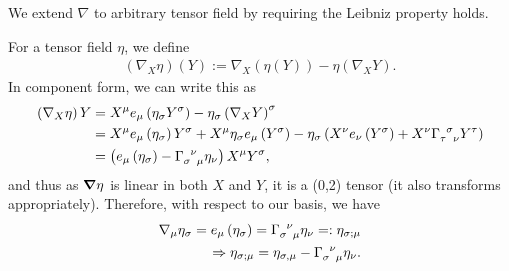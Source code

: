 We extend $\nabla$ to arbitrary tensor field by requiring the Leibniz property holds.
\begin{example}
    For a tensor field $\eta$, we define
    \begin{align}
        \left( \nabla_{X} \eta \right)  \left( Y \right) := \nabla_X \left( \eta \left( Y \right)  \right) - \eta \left( \nabla_X Y \right) 
    .\end{align}
    In component form, we can write this as
    \begin{align}
        \left( \nabla_X \eta \right) Y &= X^{\mu} e_\mu \left( \eta_\sigma Y^{\sigma} \right) - \eta_{\sigma} \left( \nabla_{X} Y \right)^{\sigma} \\
        &= X^{\mu} e_\mu \left( \eta_\sigma \right) Y^{\sigma} + X^{\mu} \eta_\sigma e_\mu \left( Y^{\sigma}\right) - \eta_\sigma \left( X^{\nu} e_\nu \left( Y^{\sigma}   \right) + X^{\nu} \tensor{\Gamma}{_{\tau}^{\sigma}_{\nu}} Y^{\tau} \right)  \\
        &= \left( e_{\mu} \left( \eta_{\sigma} \right) - \tensor{\Gamma}{_{\sigma}^{\nu}_{\mu}} \eta_{\nu} \right) X^{\mu} Y^{\sigma}
    ,\end{align}
    and thus as $\grad \eta$ is linear in both $X$ and $Y$, it is a (0,2) tensor (it also transforms appropriately).
    Therefore, with respect to our basis, we have
    \begin{align}
        \nabla_\mu \eta_\sigma = e_\mu \left( \eta_\sigma \right)  = \tensor{\Gamma}{_{\sigma}^{\nu}_\mu} \eta_\nu =: \eta_{\sigma ; \mu} \\
        \implies \eta_{\sigma ; \mu} = \eta_{\sigma , \mu} - \tensor{\Gamma}{_{\sigma}^{\nu}_\mu} \eta_\nu
    .\end{align}
\end{example}







